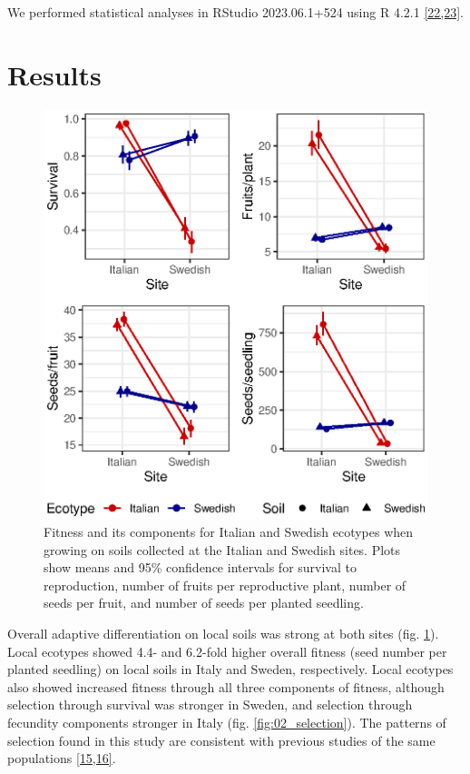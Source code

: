 \documentclass[twocolumn,twoside,lettersize]{article}
\begin{document}
We performed statistical analyses in RStudio 2023.06.1+524	 using R 4.2.1 \href{https://paperpile.com/c/ktzZ5s/4hrD+yCPV}{[22,23]}.

\section*{Results}

\begin{figure}[]
  \begin{center}
      \includegraphics[]{03_manuscript/figure1.eps}
      \caption{
          Fitness and its components for Italian and Swedish ecotypes when growing on soils collected at the Italian and Swedish sites. Plots show means and 95\% confidence intervals for survival to reproduction, number of fruits per reproductive plant, number of seeds per fruit, and number of seeds per planted seedling.
      }
      \label{fig:01_fitness}
  \end{center}
\end{figure}

Overall adaptive differentiation on local soils was strong at both sites (fig. \ref{fig:01_fitness}). Local ecotypes showed 4.4- and 6.2-fold higher overall fitness (seed number per planted seedling) on local soils in Italy and Sweden, respectively. Local ecotypes also showed increased fitness through all three components of fitness, although selection through survival was stronger in Sweden, and selection through fecundity components stronger in Italy (fig. \ref{fig:02_selection}). The patterns of selection found in this study are consistent with previous studies of the same populations \href{https://paperpile.com/c/ktzZ5s/YZ2m+oZRG}{[15,16]}.
\end{document}
